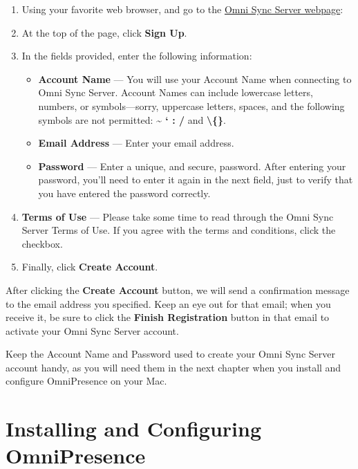 \documentclass[../main.tex]{subfiles}
\begin{document}
\begin{enumerate}
  \item Using your favorite web browser, and go to the
    \href{https://manage.sync.omnigroup.com}{Omni Sync Server webpage}:

  \item At the top of the page, click \textbf{Sign Up}.
  \item In the fields provided, enter the following information:


    \begin{itemize}
      \item \textbf{Account Name} --- You will use your Account Name when connecting to Omni Sync
        Server. Account Names can include lowercase letters, numbers, or symbols---sorry,
        uppercase letters, spaces, and the following symbols are not permitted:
        \textbf{\textasciitilde{} ` : /} and \textbf{\textbackslash\{\}}.
      \item \textbf{Email Address} --- Enter your email address.
      \item \textbf{Password} --- Enter a unique, and secure, password. After entering your
        password, you'll need to enter it again in the next field, just to verify that you have
        entered the password correctly.
    \end{itemize}
  \item \textbf{Terms of Use} --- Please take some time to read through the Omni Sync Server
    Terms of Use. If you agree with the terms and conditions, click the checkbox.
  \item Finally, click \textbf{Create Account}.
\end{enumerate}

After clicking the \textbf{Create Account} button, we will send a confirmation message to the
email address you specified. Keep an eye out for that email; when you receive it, be sure to
click the \textbf{Finish Registration} button in that email to activate your Omni Sync Server
account.

\begin{ognote}
  Keep the Account Name and Password used to create your Omni Sync Server account handy, as you
  will need them in the next chapter when you install and configure OmniPresence on your Mac.
\end{ognote}

\section{Installing and Configuring OmniPresence}
\end{document}
